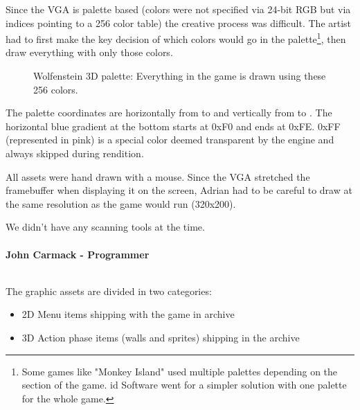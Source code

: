 \documentclass[book.tex]{subfiles}
\begin{document}
\par
Since the VGA is palette based (colors were not specified via 24-bit RGB but via indices pointing to a 256 color table) the creative process was difficult. The artist had to first make the key decision of which colors would go in the palette\footnote{Some games like "Monkey Island" used multiple palettes depending on the section of the game. id Software went for a simpler solution with one palette for the whole game.}, then draw everything with only those colors.\\
\begin{figure}[H]
  \centering
{}
 \caption{Wolfenstein 3D palette: Everything in the game is drawn using these 256 colors.}
\end{figure}
The palette coordinates are horizontally from  to  and vertically from  to . The horizontal blue gradient at the bottom starts at 0xF0 and ends at 0xFE. 0xFF (represented in pink) is a special color deemed transparent by the engine and always skipped during rendition.\\
\par

All assets were hand drawn with a mouse. Since the VGA stretched the framebuffer when displaying it on the screen, Adrian had to be careful to draw at the same resolution as the game would run (320x200).\\
\par
\begin{fancyquotes}
We didn't have any scanning tools at the time.\\
\\
\textbf{John Carmack - Programmer}
\end{fancyquotes}
\\
The graphic assets are divided in two categories:
\begin{itemize}
\item 2D Menu items shipping with the game in  archive
\item 3D Action phase items (walls and sprites) shipping in the  archive
\end{itemize}
\end{document}
